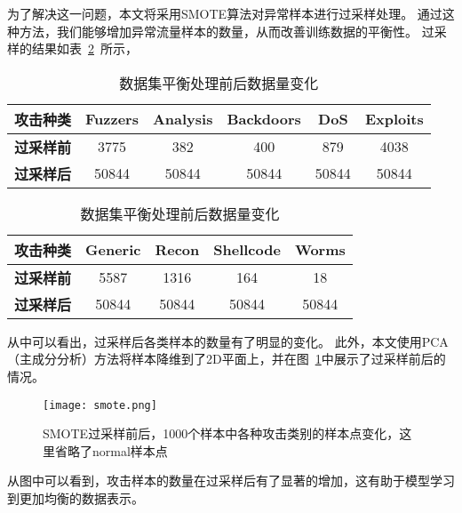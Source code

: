 为了解决这一问题，本文将采用SMOTE算法对异常样本进行过采样处理。
通过这种方法，我们能够增加异常流量样本的数量，从而改善训练数据的平衡性。
过采样的结果如表~\ref{tab:attack_num_transposed_part1}~所示，
\begin{table}[h]
	\centering
	\caption{数据集平衡处理前后数据量变化}
	\label{tab:attack_num_transposed_part1}
	\begin{tabular}{cccccc}
		\toprule
		攻击种类          & \textbf{Fuzzers} & \textbf{Analysis} & \textbf{Backdoors} & \textbf{DoS} & \textbf{Exploits} \\
		\midrule
		\textbf{过采样前} & 3775             & 382               & 400                & 879          & 4038              \\
		\textbf{过采样后} & 50844            & 50844             & 50844              & 50844        & 50844             \\
		\bottomrule
	\end{tabular}
	\begin{tabular}{ccccc}
		\toprule
		攻击种类          & \textbf{Generic} & \textbf{Recon} & \textbf{Shellcode} & \textbf{Worms} \\
		\midrule
		\textbf{过采样前} & 5587             & 1316           & 164                & 18             \\
		\textbf{过采样后} & 50844            & 50844          & 50844              & 50844          \\
		\bottomrule
	\end{tabular}
\end{table}
从中可以看出，过采样后各类样本的数量有了明显的变化。
此外，本文使用PCA（主成分分析）方法将样本降维到了2D平面上，并在图~\ref{fig:prepostsmote}中展示了过采样前后的情况。
\begin{figure}[htbp]
	\centering
	\texttt{[image: smote.png]}
	\caption{SMOTE过采样前后，1000个样本中各种攻击类别的样本点变化，这里省略了normal样本点}
	\label{fig:prepostsmote}
\end{figure}
从图中可以看到，攻击样本的数量在过采样后有了显著的增加，这有助于模型学习到更加均衡的数据表示。\par


